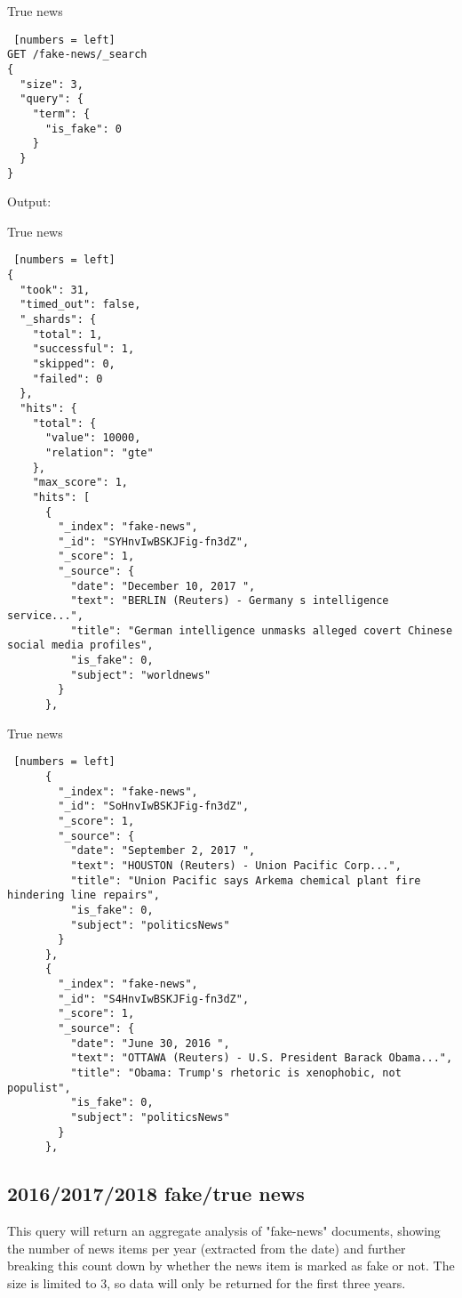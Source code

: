 \begin{algorithm}[ht]
\caption{True news}
\begin{lstlisting} [numbers = left]
GET /fake-news/_search
{  
  "size": 3,
  "query": {
    "term": {
      "is_fake": 0
    }
  }
}
\end{lstlisting}
\end{algorithm}
\newpage

Output:
\begin{algorithm}[h!]
\caption{True news}
\begin{lstlisting} [numbers = left]
{
  "took": 31,
  "timed_out": false,
  "_shards": {
    "total": 1,
    "successful": 1,
    "skipped": 0,
    "failed": 0
  },
  "hits": {
    "total": {
      "value": 10000,
      "relation": "gte"
    },
    "max_score": 1,
    "hits": [
      {
        "_index": "fake-news",
        "_id": "SYHnvIwBSKJFig-fn3dZ",
        "_score": 1,
        "_source": {
          "date": "December 10, 2017 ",
          "text": "BERLIN (Reuters) - Germany s intelligence service...",
          "title": "German intelligence unmasks alleged covert Chinese social media profiles",
          "is_fake": 0,
          "subject": "worldnews"
        }
      },
\end{lstlisting}
\end{algorithm}
\newpage
\begin{algorithm}[h!]
\caption{True news}
\begin{lstlisting} [numbers = left]
      {
        "_index": "fake-news",
        "_id": "SoHnvIwBSKJFig-fn3dZ",
        "_score": 1,
        "_source": {
          "date": "September 2, 2017 ",
          "text": "HOUSTON (Reuters) - Union Pacific Corp...",
          "title": "Union Pacific says Arkema chemical plant fire hindering line repairs",
          "is_fake": 0,
          "subject": "politicsNews"
        }
      },
      {
        "_index": "fake-news",
        "_id": "S4HnvIwBSKJFig-fn3dZ",
        "_score": 1,
        "_source": {
          "date": "June 30, 2016 ",
          "text": "OTTAWA (Reuters) - U.S. President Barack Obama...",
          "title": "Obama: Trump's rhetoric is xenophobic, not populist",
          "is_fake": 0,
          "subject": "politicsNews"
        }
      },

\end{lstlisting}
\end{algorithm}
\newpage
\subsection{2016/2017/2018 fake/true news}
This query will return an aggregate analysis of "fake-news" documents, showing the number of news items per year (extracted from the date) and further breaking this count down by whether the news item is marked as fake or not. The size is limited to 3, so data will only be returned for the first three years.\\

